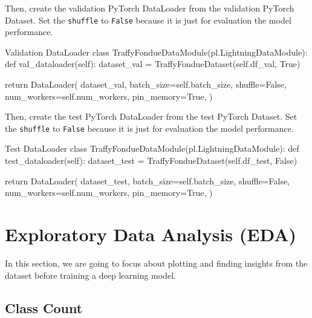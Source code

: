 \documentclass[12pt, a4paper]{article}
\begin{document}
	\pagebreak

                Then, create the validation PyTorch DataLoader from the validation PyTorch Dataset.
                Set the \texttt{shuffle} to \texttt{False} because it is just for evaluation the model performance.
                \begin{codeblock}{Validation DataLoader}
                    class TraffyFondueDataModule(pl.LightningDataModule):
                        def val_dataloader(self):
                            dataset_val = TraffyFondueDataset(self.df_val, True)

                            return DataLoader(
                                dataset_val,
                                batch_size=self.batch_size,
                                shuffle=False,
                                num_workers=self.num_workers,
                                pin_memory=True,
                            )
                \end{codeblock}

                Then, create the test PyTorch DataLoader from the test PyTorch Dataset.
                Set the \texttt{shuffle} to \texttt{False} because it is just for evaluation the model performance.
                \begin{codeblock}{Test DataLoader}
                    class TraffyFondueDataModule(pl.LightningDataModule):
                        def test_dataloader(self):
                            dataset_test = TraffyFondueDataset(self.df_test, False)

                            return DataLoader(
                                dataset_test,
                                batch_size=self.batch_size,
                                shuffle=False,
                                num_workers=self.num_workers,
                                pin_memory=True,
                            )
                \end{codeblock}

    \pagebreak

        \section{Exploratory Data Analysis (EDA)}
            In this section, we are going to focus about plotting and finding insights from the dataset
            before training a deep learning model.

            \subsection{Class Count}
\end{document}
